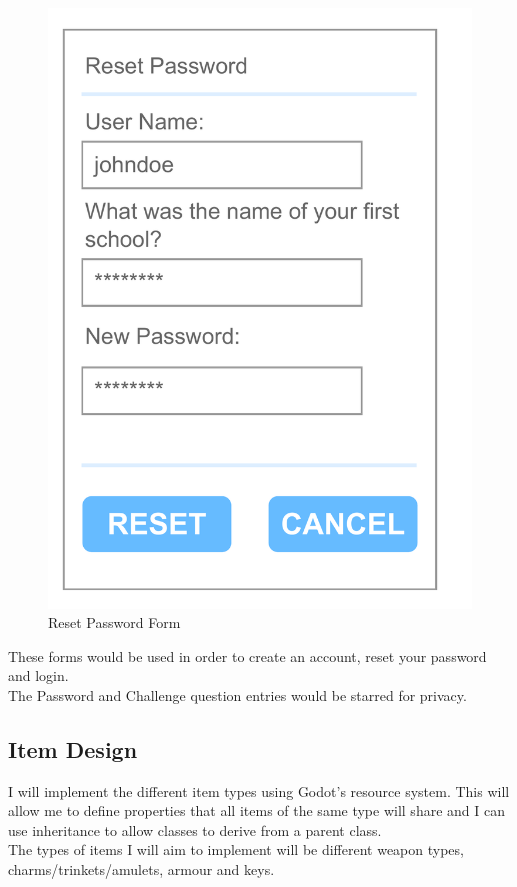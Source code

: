\documentclass{article}
\begin{document}
\begin{multicols}{3}
\begin{figure}[H]
                        \includegraphics[width = 0.9\columnwidth]{images/design/Reset_Password.pdf}
                        \caption{Reset Password Form}
                        \label{fig:ie_5}
                \end{figure}
        \end{multicols}\[\]
        These forms would be used in order to create an account, reset your password and login.\\
        The Password and Challenge question entries would be starred for privacy.\\
        \newpage
        \subsection{Item Design}
        I will implement the different item types using Godot's resource system. This will allow me to define properties that all items of the same type will share and I can use inheritance to allow classes to derive from a parent class.\\
        The types of items I will aim to implement will be different weapon types, charms/trinkets/amulets, armour and keys.\\
\end{document}
